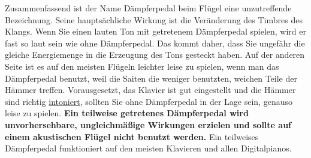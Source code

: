 Zusammenfassend ist der Name Dämpferpedal beim Flügel eine unzutreffende Bezeichnung.
Seine hauptsächliche Wirkung ist die Veränderung des Timbres des Klangs.
Wenn Sie einen lauten Ton mit getretenem Dämpferpedal spielen, wird er fast so laut sein wie ohne Dämpferpedal.
Das kommt daher, dass Sie ungefähr die gleiche Energiemenge in die Erzeugung des Tons gesteckt haben.
Auf der anderen Seite ist es auf den meisten Flügeln leichter leise zu spielen, wenn man das Dämpferpedal benutzt, weil die Saiten die weniger benutzten, weichen Teile der Hämmer treffen.
Vorausgesetzt, das Klavier ist gut eingestellt und die Hämmer sind richtig \hyperlink{c2_7_hamm}{intoniert}, sollten Sie ohne Dämpferpedal in der Lage sein, genauso leise zu spielen.
\textbf{Ein teilweise getretenes Dämpferpedal wird unvorhersehbare, ungleichmäßige Wirkungen erzielen und sollte auf einem akustischen Flügel nicht benutzt werden.}
Ein teilweises Dämpferpedal funktioniert auf den meisten Klavieren und allen Digitalpianos.




